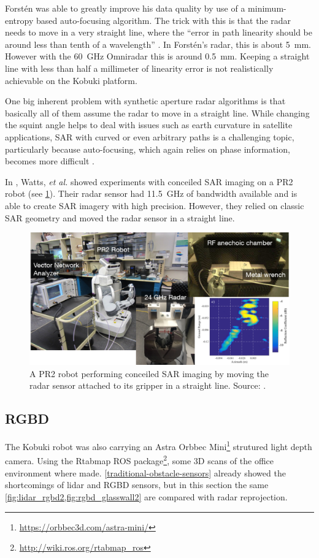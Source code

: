 Forstén was able to greatly improve his data quality by use of a minimum-entropy based auto-focusing algorithm. The trick with this is that the radar needs to move in a very straight line, where the ``error in path linearity should be around less than tenth of a wavelength'' \cite{Forsten2015}. In Forstén's radar, this is about \SI{5}{mm}. However with the \SI{60}{GHz} Omniradar this is around \SI{0.5}{mm}. Keeping a straight line with less than half a millimeter of linearity error is not realistically achievable on the Kobuki platform.


One big inherent problem with synthetic aperture radar algorithms is
that basically all of them assume the radar to move in a straight line.
While changing the squint angle helps to deal with issues such as earth
curvature in satellite applications, SAR with curved or even arbitrary
paths is a challenging topic, particularly because auto-focusing, which
again relies on phase information, becomes more difficult
\cite{Axelsson2002}.

In \cite{Watts2016}, Watts, \textit{et al.} showed experiments with conceiled SAR imaging on a PR2 robot (see \cref{fig:pr2}). Their radar sensor had \SI{11.5}{GHz} of bandwidth available and is able to create SAR imagery with high precision. However, they relied on classic SAR geometry and moved the radar sensor in a straight line.

\begin{figure}[htbp]
    \centering
    \includegraphics[max width=\textwidth]{gfx/pictures/pr2_sar.png}
    \caption{A PR2 robot performing conceiled SAR imaging by moving the radar sensor attached to its gripper in a straight line. Source: \cite{Watts2016}.}
    \label{fig:pr2}
\end{figure}


\subsection{RGBD}\label{rgbd-1}
The Kobuki robot was also carrying an Astra Orbbec Mini\footnote{\url{https://orbbec3d.com/astra-mini/}} strutured light depth camera. Using the Rtabmap \cite{Labbe2014} ROS package\footnote{\url{http://wiki.ros.org/rtabmap_ros}}, some 3D scans of the office environment where made. \cref{traditional-obstacle-sensors} already showed the shortcomings of lidar and RGBD sensors, but in this section the same \cref{fig:lidar_rgbd2,fig:rgbd_glasswall2} are compared with radar reprojection.

